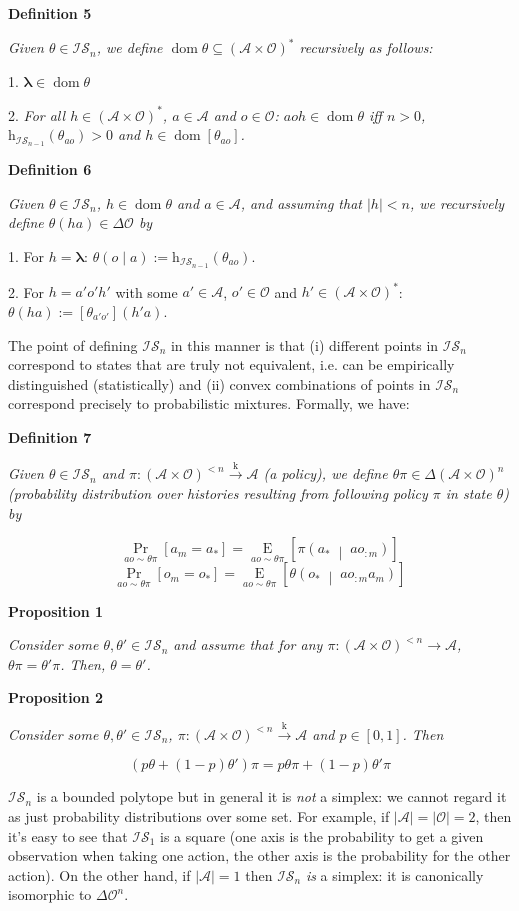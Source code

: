 \documentclass[a4paper]{article}
\newcommand{\Co}[1]{}
\DeclareMathOperator{\Dom}{dom}
\newcommand{\AP}[1]{\left(#1\right)}
\newcommand{\AB}[1]{\left[#1\right]}
\newcommand{\APM}[2]{\left(#1\;\middle\vert\;#2\right)}
\newcommand{\Abs}[1]{\left\vert #1 \right\vert}
\newcommand{\Pa}[2]{\underset{#1}{\operatorname{Pr}}\AB{#2}}
\newcommand{\Ea}[2]{\underset{#1}{\operatorname{E}}\AB{#2}}
\newcommand{\K}{\xrightarrow{\mathrm{k}}}
\newcommand{\Estr}{\boldsymbol{\lambda}} %
\newcommand{\A}{\mathcal{A}}
\newcommand{\Ob}{\mathcal{O}}
\newcommand{\AO}{\AP{\A\times\Ob}}
\newcommand{\FH}{\AO^*}
\newcommand{\Ht}{\mathrm{h}}
\newcommand{\IS}{\mathcal{IS}}
\begin{document}
\textbf{Definition 5}\Co{b}

\textit{Given $\theta\in\IS_n$, we define $\Dom\theta\subseteq\FH$ recursively as follows:}

1. $\Estr\in\Dom\theta$

2. \textit{For all $h\in\FH$, $a\in\A$ and $o\in\Ob$: $aoh\in\Dom\theta$ iff $n>0$, $\Ht_{\IS_{n-1}}(\theta_{ao})>0$ and $h\in\Dom\AB{\theta_{ao}}$.}

\textbf{Definition 6}

\textit{Given $\theta\in\IS_n$, $h\in\Dom\theta$ and $a\in\A$, and assuming that $\Abs{h}<n$, we recursively define $\theta(ha)\in\Delta\Ob$ by}\Co{i}

1. For $h=\Estr$: $\theta( o\mid a):=\Ht_{\IS_{n-1}}(\theta_{ao})$.

2. For $h=a'o'h'$ with some $a'\in\A$, $o'\in\Ob$ and $h'\in\FH$: $\theta(ha):=\AB{\theta_{a'o'}}(h'a)$.

The point of defining $\IS_n$ in this manner is that (i) different points in $\IS_n$ correspond to states that are truly not equivalent, i.e. can be empirically distinguished (statistically) and (ii) convex combinations of points in $\IS_n$ correspond precisely to probabilistic mixtures. Formally, we have:

\textbf{Definition 7}\Co{b}

\textit{Given $\theta\in\IS_n$ and $\pi:\AO^{<n}\K\A$ (a policy), we define $\theta\pi\in\Delta\AO^n$ (probability distribution over histories resulting from following policy $\pi$ in state $\theta$) by}\Co{i}

$$\Pa{ao\sim\theta\pi}{a_m=a_*}=\Ea{ao\sim\theta\pi}{\pi\APM{a_*}{ao_{:m}}}$$
$$\Pa{ao\sim\theta\pi}{o_m=o_*}=\Ea{ao\sim\theta\pi}{\theta\APM{o_*}{ao_{:m}a_m}}$$

\textbf{Proposition 1}\Co{b}

\textit{Consider some $\theta,\theta'\in\IS_n$ and assume that for any $\pi:\AO^{<n}\rightarrow\A$, $\theta\pi=\theta'\pi$. Then, $\theta=\theta'$.}\Co{i}

\textbf{Proposition 2}\Co{b}

\textit{Consider some $\theta,\theta'\in\IS_n$,  $\pi:\AO^{<n}\K\A$ and $p\in[0,1]$. Then}\Co{i}

$$\AP{p\theta+(1-p)\theta'}\pi=p\theta\pi+(1-p)\theta'\pi$$

$\IS_n$ is a bounded polytope but in general it is \textit{not} a simplex: we cannot regard it as just probability distributions over some set. For example, if $\Abs{\A}=\Abs{\Ob}=2$, then it's easy to see that $\IS_1$ is a square (one axis is the probability to get a given observation when taking one action, the other axis is the probability for the other action). On the other hand, if $\Abs{\A}=1$ then $\IS_n$ \textit{is}\Co{i} a simplex: it is canonically isomorphic to $\Delta\Ob^n$.
\end{document}
